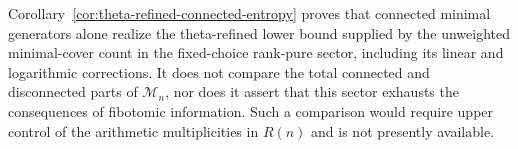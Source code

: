 \begin{remark}\label{rem:connected-lower-not-dominance}
Corollary~\ref{cor:theta-refined-connected-entropy} proves that connected
minimal generators alone realize the theta-refined lower bound supplied by the
unweighted minimal-cover count in the fixed-choice rank-pure sector, including
its linear and logarithmic corrections. It does not compare the total connected
and disconnected parts of $\mathcal M_n$, nor does it assert that this sector
exhausts the consequences of fibotomic information. Such a comparison would
require upper control of the arithmetic multiplicities in $R(n)$ and is not
presently available.
\end{remark}

